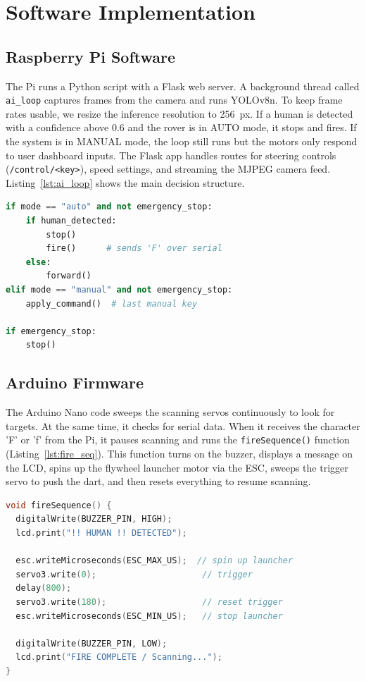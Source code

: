 \documentclass[conference]{IEEEtran}
\begin{document}
\section{Software Implementation}
\subsection{Raspberry Pi Software}
The Pi runs a Python script with a Flask web server. A background thread called \texttt{ai\_loop} captures frames from the camera and runs YOLOv8n. To keep frame rates usable, we resize the inference resolution to 256~px. If a human is detected with a confidence above 0.6 and the rover is in AUTO mode, it stops and fires. If the system is in MANUAL mode, the loop still runs but the motors only respond to user dashboard inputs. The Flask app handles routes for steering controls (\texttt{/control/<key>}), speed settings, and streaming the MJPEG camera feed. Listing~\ref{lst:ai_loop} shows the main decision structure.

\begin{lstlisting}[caption={Core AUTO/MANUAL decision logic (simplified from \texttt{ai\_loop}).}, label={lst:ai_loop}, language=Python]
if mode == "auto" and not emergency_stop:
    if human_detected:
        stop()
        fire()      # sends 'F' over serial
    else:
        forward()
elif mode == "manual" and not emergency_stop:
    apply_command()  # last manual key

if emergency_stop:
    stop()
\end{lstlisting}

\subsection{Arduino Firmware}
The Arduino Nano code sweeps the scanning servos continuously to look for targets. At the same time, it checks for serial data. When it receives the character 'F' or 'f' from the Pi, it pauses scanning and runs the \texttt{fireSequence()} function (Listing~\ref{lst:fire_seq}). This function turns on the buzzer, displays a message on the LCD, spins up the flywheel launcher motor via the ESC, sweeps the trigger servo to push the dart, and then resets everything to resume scanning.

\begin{lstlisting}[caption={Fire sequence executed on the Arduino Nano.}, label={lst:fire_seq}, language=C++]
void fireSequence() {
  digitalWrite(BUZZER_PIN, HIGH);
  lcd.print("!! HUMAN !! DETECTED");

  esc.writeMicroseconds(ESC_MAX_US);  // spin up launcher
  servo3.write(0);                     // trigger
  delay(800);
  servo3.write(180);                   // reset trigger
  esc.writeMicroseconds(ESC_MIN_US);   // stop launcher

  digitalWrite(BUZZER_PIN, LOW);
  lcd.print("FIRE COMPLETE / Scanning...");
}
\end{lstlisting}
\end{document}
